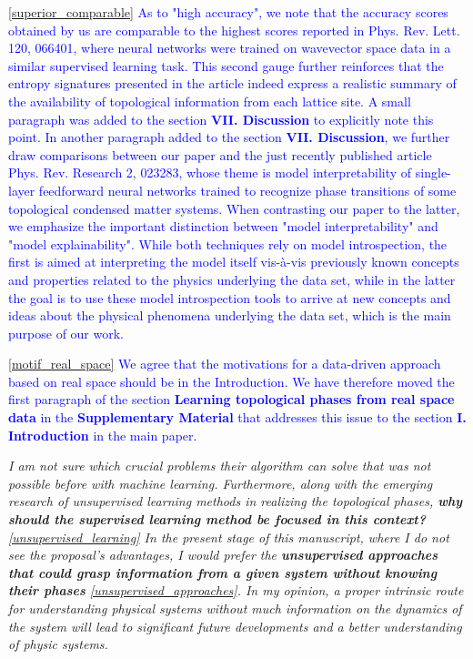 \documentclass[10pt]{revtex4-1}
\newcounter{quoter}
\newcommand{\genquote}[1]{\refstepcounter{quoter} \label{#1} \ref{#1}}
\newcommand{\citequote}[1]{\ref{#1}}
\begin{document}
\textcolor{blue}{\citequote{superior_comparable} As to "high accuracy", we note that the accuracy scores obtained by us are comparable to the highest scores reported in Phys. Rev. Lett. 120, 066401, where neural networks were trained on wavevector space data in a similar supervised learning task. This second gauge further reinforces that the entropy signatures presented in the article indeed express a realistic summary of the availability of topological information from each lattice site. A small paragraph was added to the section \textbf{VII. Discussion} to explicitly note this point. In another paragraph added to the section \textbf{VII. Discussion}, we further draw comparisons between our paper and the just recently published article Phys. Rev. Research 2, 023283,  whose theme is model interpretability of single-layer feedforward neural networks trained to recognize phase transitions of some topological condensed matter systems. When contrasting our paper to the latter, we emphasize the important distinction between "model interpretability" and "model explainability". While both techniques rely on model introspection, the first is aimed at interpreting the model itself vis-\`{a}-vis previously known concepts and properties related to the physics underlying the data set, while in the latter the goal is to use these model introspection tools to arrive at new concepts and ideas about the physical phenomena underlying the data set, which is the main purpose of our work.}   

\textcolor{blue}{\citequote{motif_real_space} We agree that the motivations for a data-driven approach based on real space should be in the Introduction.  We have therefore moved the first paragraph of the section \textbf{Learning topological phases from real space data} in the \textbf{Supplementary Material} that addresses this issue to the section \textbf{I. Introduction} in the main paper.}  

\vspace{0.5cm}
\emph{I am not sure which crucial problems their algorithm can solve that was not possible before with machine learning. Furthermore, along with the emerging research of unsupervised learning methods in realizing the topological phases, \textbf{why should the supervised learning method be focused in this context?}\genquote{unsupervised_learning} In the present stage of this manuscript, where I do not see the proposal's advantages, I would prefer the \textbf{unsupervised approaches that could grasp information from a given system without knowing their phases}\genquote{unsupervised_approaches}. In my opinion, a proper intrinsic route for understanding physical systems without much information on
the dynamics of the system will lead to significant future developments and a better understanding of physic systems.}
\end{document}
